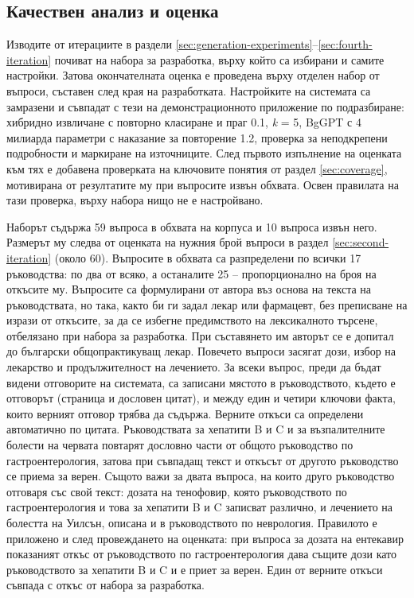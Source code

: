 \documentclass[12pt,a4paper]{article}
\makeatletter
\renewcommand\paragraph{\@startsection{paragraph}{4}{\z@}{1.5ex \@plus .5ex \@minus .2ex}{-1em}{\normalfont\normalsize\bfseries}}
\makeatother
\begin{document}
\subsection{Качествен анализ и оценка}
\label{sec:qualitative-eval}
Изводите от итерациите в раздели \ref{sec:generation-experiments}--\ref{sec:fourth-iteration} почиват на набора за разработка, върху който са избирани и самите настройки. Затова окончателната оценка е проведена върху отделен набор от въпроси, съставен след края на разработката. Настройките на системата са замразени и съвпадат с тези на демонстрационното приложение по подразбиране: хибридно извличане с повторно класиране и праг 0.1, \textit{k} = 5, BgGPT с 4 милиарда параметри с наказание за повторение 1.2, проверка за неподкрепени подробности и маркиране на източниците. След първото изпълнение на оценката към тях е добавена проверката на ключовите понятия от раздел \ref{sec:coverage}, мотивирана от резултатите му при въпросите извън обхвата. Освен правилата на тази проверка, върху набора нищо не е настройвано.

\paragraph{Набор за оценка.} Наборът съдържа 59 въпроса в обхвата на корпуса и 10 въпроса извън него. Размерът му следва от оценката на нужния брой въпроси в раздел \ref{sec:second-iteration} (около 60). Въпросите в обхвата са разпределени по всички 17 ръководства: по два от всяко, а останалите 25 -- пропорционално на броя на откъсите му. Въпросите са формулирани от автора въз основа на текста на ръководствата, но така, както би ги задал лекар или фармацевт, без преписване на изрази от откъсите, за да се избегне предимството на лексикалното търсене, отбелязано при набора за разработка. При съставянето им авторът се е допитал до български общопрактикуващ лекар. Повечето въпроси засягат дози, избор на лекарство и продължителност на лечението. За всеки въпрос, преди да бъдат видени отговорите на системата, са записани мястото в ръководството, където е отговорът (страница и дословен цитат), и между един и четири ключови факта, които верният отговор трябва да съдържа. Верните откъси са определени автоматично по цитата. Ръководствата за хепатити B и C и за възпалителните болести на червата повтарят дословно части от общото ръководство по гастроентерология, затова при съвпадащ текст и откъсът от другото ръководство се приема за верен. Същото важи за двата въпроса, на които друго ръководство отговаря със свой текст: дозата на тенофовир, която ръководството по гастроентерология и това за хепатити B и C записват различно, и лечението на болестта на Уилсън, описана и в ръководството по неврология. Правилото е приложено и след провеждането на оценката: при въпроса за дозата на ентекавир показаният откъс от ръководството по гастроентерология дава същите дози като ръководството за хепатити B и C и е приет за верен. Един от верните откъси съвпада с откъс от набора за разработка.
\end{document}
